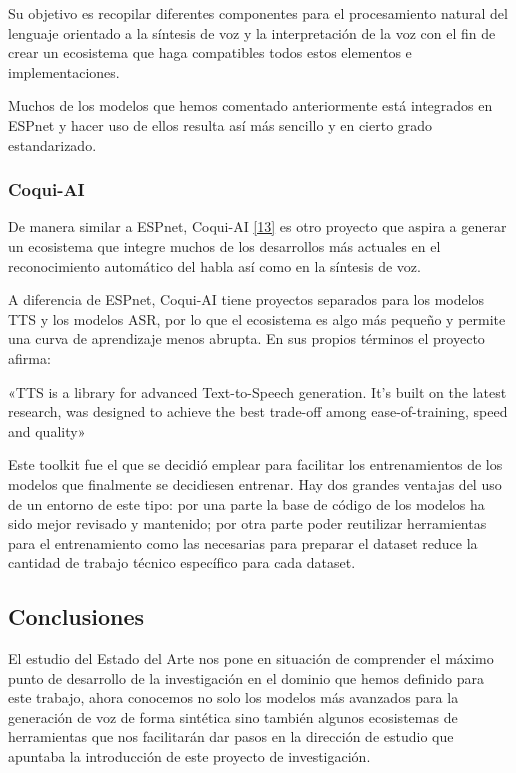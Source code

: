 Su objetivo es recopilar diferentes componentes para el procesamiento natural del lenguaje orientado a la síntesis de voz y la interpretación de la voz con el fin de crear un ecosistema que haga compatibles todos estos elementos e implementaciones.

Muchos de los modelos que hemos comentado anteriormente está integrados en ESPnet y hacer uso de ellos resulta así más sencillo y en cierto grado estandarizado.

\subsubsection{Coqui-AI}

De manera similar a ESPnet, Coqui-AI  \hyperref[EA_3]{[13]} es otro proyecto que aspira a generar un ecosistema que integre muchos de los desarrollos más actuales en el reconocimiento automático del habla así como en la síntesis de voz.

A diferencia de ESPnet, Coqui-AI tiene proyectos separados para los modelos TTS y los modelos ASR, por lo que el ecosistema es algo más pequeño y permite una curva de aprendizaje menos abrupta. En sus propios términos el proyecto afirma:

\begin{displayquote}
«TTS is a library for advanced Text-to-Speech generation. It's built on the latest research, was designed to achieve the best trade-off among ease-of-training, speed and quality»
\end{displayquote}

Este toolkit fue el que se decidió emplear para facilitar los entrenamientos de los modelos que finalmente se decidiesen entrenar. Hay dos grandes ventajas del uso de un entorno de este tipo: por una parte la base de código de los modelos ha sido mejor revisado y mantenido; por otra parte poder reutilizar herramientas para el entrenamiento como las necesarias para preparar el dataset reduce la cantidad de trabajo técnico específico para cada dataset.

\subsection{Conclusiones}

El estudio del Estado del Arte nos pone en situación de comprender el máximo punto de desarrollo de la investigación en el dominio que hemos definido para este trabajo, ahora conocemos no solo los modelos más avanzados para la generación de voz de forma sintética sino también algunos ecosistemas de herramientas que nos facilitarán dar pasos en la dirección de estudio que apuntaba la introducción de este proyecto de investigación. 

\newpage 
